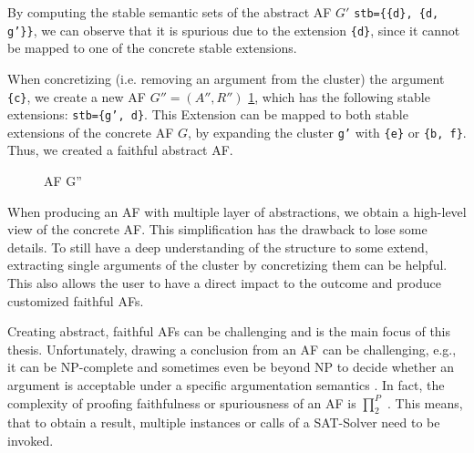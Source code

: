 By computing the stable semantic sets of the abstract AF $G'$ \texttt{stb=\{\{d\}, \{d, g'\}\}}, we can observe that it is spurious due to the extension \texttt{\{d\}}, since it cannot be mapped to one of the concrete stable extensions. 

When concretizing (i.e. removing an argument from the cluster) the argument \texttt{\{c\}}, we create a new AF $G'' = (A'', R'')$ \ref{af:introExample3}, which has the following stable extensions: \texttt{stb=\{g', d\}}. This Extension can be mapped to both stable extensions of the concrete AF $G$, by expanding the cluster \texttt{g'} with \texttt{\{e\}} or \texttt{\{b, f\}}. Thus, we created a faithful abstract AF.

\begin{figure}[h]
    \centering
    \caption{AF G''}
    \label{af:introExample3}
\end{figure}


When producing an AF with multiple layer of abstractions, we obtain a high-level view of the concrete AF. This simplification has the drawback to lose some details. To still have a deep understanding of the structure to some extend, extracting single arguments of the cluster by concretizing them can be helpful. This also allows the user to have a direct impact to the outcome and produce customized faithful AFs.


Creating abstract, faithful AFs can be challenging and is the main focus of this thesis. Unfortunately, drawing a conclusion from an AF can be challenging, e.g., it can be NP-complete and sometimes even be beyond NP to decide whether an argument is acceptable under a specific argumentation semantics \cite{DBLP:journals/ai/DvorakGRW23}. In fact, the complexity of proofing faithfulness or spuriousness of an AF is $\prod_2^P$ \cite{DBLP:conf/kr/SaribaturW21}. This means, that to obtain a result, multiple instances or calls of a SAT-Solver need to be invoked.

